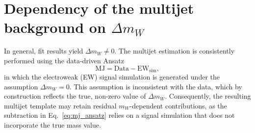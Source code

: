 \chapter{Dependency of the multijet background on $\Delta m_W$}
\label{a:mj_mW_dependency}

In general, fit results yield $\Delta m_W \neq 0$.
The multijet estimation is consistently performed using the data-driven Ansatz
%
\begin{equation}
    \mathrm{MJ} = \mathrm{Data} - \mathrm{EW}_{\mathrm{sim}},
    \label{eq:mj_ansatz}
\end{equation}
%
in which the electroweak (EW) signal simulation is generated under the assumption $\Delta m_W = 0$.
This assumption is inconsistent with the data, which by construction reflects the true, non-zero value of $\Delta m_W$.
Consequently, the resulting multijet template may retain residual $m_W$-dependent contributions, as the subtraction in Eq.~\ref{eq:mj_ansatz} relies on a signal simulation that does not incorporate the true mass value.

